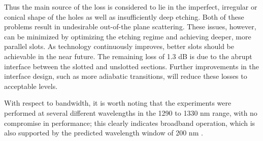 Thus the main source of the loss is considered to lie in the
imperfect, irregular or conical shape of the holes as well as
insufficiently deep etching. Both of these problems result in
undesirable out-of-the plane scattering. These issues, however, can be
minimized by optimizing the etching regime and achieving deeper, more
parallel slots. As technology continuously improves, better slots
should be achievable in the near future. The remaining loss of 1.3 dB
is due to the abrupt interface between the slotted and unslotted
sections. Further improvements in the interface design, such as more
adiabatic transitions, will reduce these losses to acceptable levels.
 
With respect to bandwidth, it is worth noting that the experiments
were performed at several different wavelengths in the 1290 to 1330 nm
range, with no compromise in performance; this clearly indicates
broadband operation, which is also supported by the predicted
wavelength window of 200 nm .

